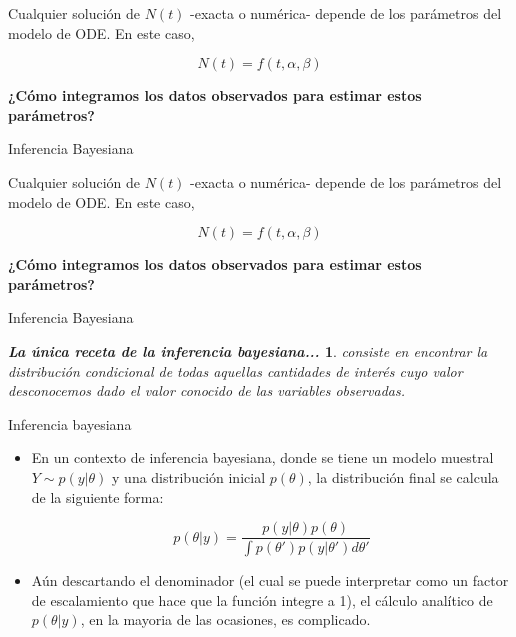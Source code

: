 \documentclass[11pt]{beamer}
\newtheorem{recetabayesiana}{\textit{La única receta de la inferencia bayesiana...}}
\begin{document}
\begin{frame}

Cualquier solución de $N(t)$ -exacta o numérica- depende de los parámetros del modelo de ODE. En este caso,

\[N(t) = f(t,\alpha,\beta)\]

\begin{center}
	\textbf{¿Cómo integramos los datos observados para estimar estos parámetros?}
\end{center}

\begin{center}
{\color{red}\huge Inferencia Bayesiana}
\end{center}

\end{frame}

\begin{frame}

Cualquier solución de $N(t)$ -exacta o numérica- depende de los parámetros del modelo de ODE. En este caso,

\[N(t) = f(t,\alpha,\beta)\]

\begin{center}
	\textbf{¿Cómo integramos los datos observados para estimar estos parámetros?}
\end{center}

\begin{center}
{\color{red}\huge Inferencia Bayesiana}
\end{center}

\begin{recetabayesiana}
consiste en encontrar la distribución condicional de todas aquellas cantidades de interés cuyo valor desconocemos dado el valor conocido de las variables observadas.
\end{recetabayesiana}
\end{frame}



\begin{frame}{Inferencia bayesiana}
	\begin{itemize}
		\item En un contexto de inferencia bayesiana, donde se tiene un modelo muestral $Y \sim p(y|\theta)$ y una distribución inicial $p(\theta)$, la distribución final se calcula de la siguiente forma:
		
		 \begin{equation*}
		 	p(\theta | y) =  \dfrac{p(y | \theta)p(\theta)}{\int p(\theta{'}) p(y|\theta{'})d\theta{'}}
		 \end{equation*} 
		\item Aún descartando el denominador (el cual se puede interpretar como un factor de escalamiento que hace que la función integre a 1), el cálculo analítico de $p(\theta | y) $, en la mayoria de las ocasiones, es complicado.
	\end{itemize}
	
\end{frame}
\end{document}
